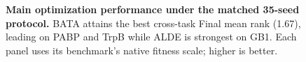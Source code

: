 \begin{figure}[t]
{}
\caption{\textbf{Main optimization performance under the matched 35-seed protocol.} BATA attains the best cross-task Final mean rank (1.67), leading on PABP and TrpB while ALDE is strongest on GB1. Each panel uses its benchmark's native fitness scale; higher is better.}
\label{fig:main_performance}
\end{figure}
